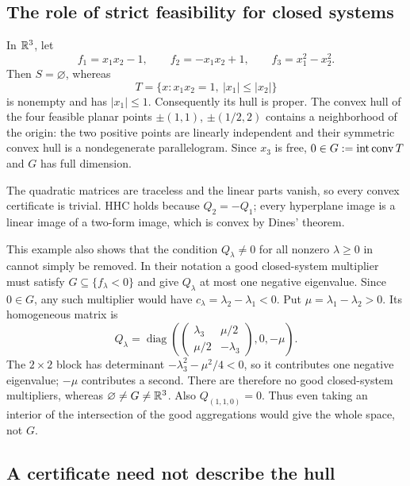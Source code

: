 \subsection{The role of strict feasibility for closed systems}

\begin{example}\label{ex:closed}
In $\mathbb R^3$, let
\[
 f_1=x_1x_2-1,\qquad f_2=-x_1x_2+1,\qquad f_3=x_1^2-x_2^2.
\]
Then $S=\varnothing$, whereas
\[
 T=\{x:x_1x_2=1,\ |x_1|\leq|x_2|\}
\]
is nonempty and has $|x_1|\leq1$. Consequently its hull is proper.
The convex hull of the four feasible planar points
$\pm(1,1)$, $\pm(1/2,2)$ contains a neighborhood of the origin:
the two positive points are linearly independent and their symmetric
convex hull is a nondegenerate parallelogram. Since $x_3$ is free,
$0\in G:=\operatorname{int}\operatorname{conv} T$ and $G$ has full dimension.

The quadratic matrices are traceless and the linear parts vanish,
so every convex certificate is trivial. HHC holds because
$Q_2=-Q_1$; every hyperplane image is a linear image of a two-form
image, which is convex by Dines' theorem.

This example also shows that the condition
$Q_\lambda\ne0$ for all nonzero $\lambda\geq0$ in
\citet[Theorem~2.24 and Remark~2.25]{BDSpreprint} cannot simply
be removed. In their notation a good closed-system multiplier
must satisfy $G\subseteq\{f_\lambda<0\}$ and give $Q_\lambda$
at most one negative eigenvalue. Since $0\in G$, any such multiplier
would have $c_\lambda=\lambda_2-\lambda_1<0$.
Put $\mu=\lambda_1-\lambda_2>0$. Its homogeneous matrix is
\[
 Q_\lambda=\operatorname{diag}\left(
  \begin{pmatrix}\lambda_3&\mu/2\\\mu/2&-\lambda_3\end{pmatrix},
   0,-\mu\right).
\]
The $2\times2$ block has determinant
$-\lambda_3^2-\mu^2/4<0$, so it contributes one negative
eigenvalue; $-\mu$ contributes a second. There are therefore no
good closed-system multipliers, whereas
$\varnothing\ne G\ne\mathbb R^3$. Also $Q_{(1,1,0)}=0$.
Thus even taking an interior of the intersection of the good
aggregations would give the whole space, not $G$.
\end{example}

\subsection{A certificate need not describe the hull}

